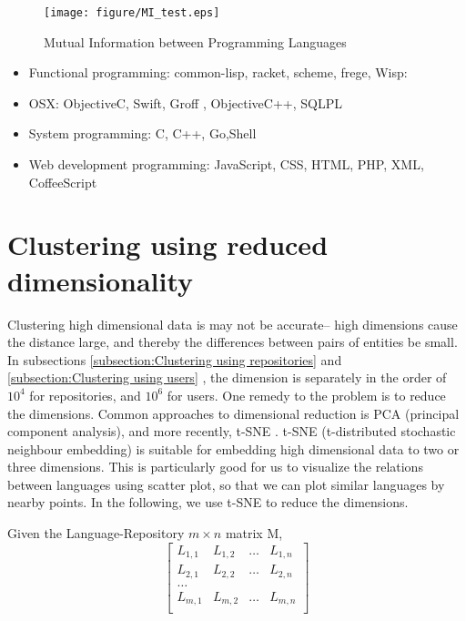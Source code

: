 \documentclass[12pt,oneside,final]{vlsithesis}
\begin{document}
\begin{figure*}
	\centering
	\texttt{[image: figure/MI\_test.eps]}
	\caption{Mutual Information between  Programming Languages}
	\label{fig:Mutual Information between  Programming Languages}
\end{figure*}

\begin{itemize}
\item Functional programming: common-lisp, racket, scheme, frege, Wisp:
\item OSX: ObjectiveC, Swift, Groff %
, ObjectiveC++, SQLPL
\item System programming: C, C++, Go,Shell
\item Web development programming: JavaScript, CSS, HTML, PHP, XML, CoffeeScript 
\end{itemize}

\section{Clustering using reduced dimensionality}

Clustering high dimensional data is may not be accurate-- high dimensions cause the distance large, and thereby the differences between pairs of entities be small. In subsections \ref{subsection:Clustering using repositories} and  \ref{subsection:Clustering using users} , the dimension is separately in the order of $10^4$ for repositories, and $10^6$ for users. %
One remedy to the problem is to reduce the dimensions. Common approaches to dimensional reduction is PCA (principal component analysis), and more recently, t-SNE \cite{maaten2008visualizing}. t-SNE (t-distributed stochastic neighbour embedding) is suitable for embedding high dimensional data to two or three dimensions. This is particularly good for us to visualize the relations between languages using scatter plot, so that we can plot similar languages by nearby points.  In the following, we use t-SNE to reduce the dimensions. 


Given the Language-Repository $m\times n$ matrix M, 
\[
\begin{bmatrix}
L_{1,1} & L_{1,2} & \dots &L_{1,n} \\
L_{2,1} & L_{2,2} & \dots &L_{2,n} \\
\dots \\
L_{m,1} & L_{m,2} & \dots &L_{m,n} \\
\end{bmatrix}
\]
\end{document}
